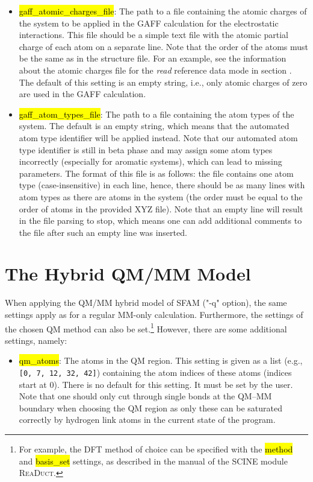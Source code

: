\documentclass[]{tufte-book}
\begin{document}
{{\begin{itemize}
\item \hl{gaff\_atomic\_charges\_file}: The path to a file containing the atomic charges of the system to be applied in the GAFF calculation for the electrostatic interactions. This file should be a simple text file with the atomic partial charge of each atom on a separate line. Note that the order of the atoms must be the same as in the structure file. For an example, see the information about the atomic charges file for the \textit{read} reference data mode in section . The default of this setting is an empty string, i.e., only atomic charges of zero are used in the GAFF calculation.
\item \hl{gaff\_atom\_types\_file}: The path to a file containing the atom types of the system. The default is an empty string, which means that the automated atom type identifier will be applied instead. Note that our automated atom type identifier is still in beta phase and may assign some atom types incorrectly (especially for aromatic systems), which can lead to missing parameters. The format of this file is as follows: the file contains one atom type (case-insensitive) in each line, hence, there should be as many lines with atom types as there are atoms in the system (the order must be equal to the order of atoms in the provided XYZ file). Note that an empty line will result in the file parsing to stop, which means one can add additional comments to the file after such an empty line was inserted.
\end{itemize}


\chapter{The Hybrid QM/MM Model}
\label{sec:qm_mm}

When applying the QM/MM hybrid model of SFAM ("-q" option), the same settings apply as for a regular MM-only calculation. Furthermore, the settings of the chosen QM method can also be set.\footnote{For example, the DFT method of choice can be specified with the \hl{method} and \hl{basis\_set} settings, as described in the manual of the SCINE module \textsc{ReaDuct}.} However, there are some additional settings, namely:

\begin{itemize}
\item \hl{qm\_atoms}: The atoms in the QM region. This setting is given as a list (e.g., \texttt{[0, 7, 12, 32, 42]}) containing the atom indices of these atoms (indices start at 0). There is no default for this setting. It must be set by the user. Note that one should only cut through single bonds at the QM--MM boundary when choosing the QM region as only these can be saturated correctly by hydrogen link atoms in the current state of the program.



\end{itemize}}}
\end{document}
